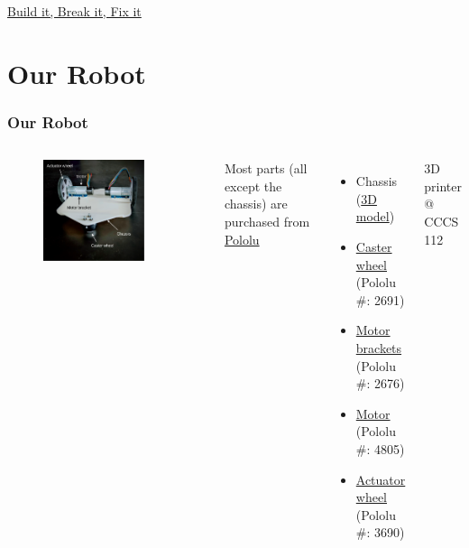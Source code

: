 \documentclass[12pt,letterpaper]{beamer}
\begin{document}
\begin{frame}{}
    \href{https://youtu.be/EezdinoG4mk}{Build it, Break it, Fix it}
    
\end{frame}

\section{Our Robot}

\begin{frame}
\frametitle{Our Robot}

\begin{columns}

\begin{figure}
    \includegraphics[width=0.8\textwidth]{3421bot}
\end{figure}

Most parts (all except the chassis) are purchased from \href{https://www.pololu.com/}{Pololu}
{\scriptsize 
\begin{itemize}
    \item Chassis (\href{https://github.com/linzhangUCA/robotics1-2021/blob/main/0819/chassis_v3.stl}{3D model})
    \item \href{https://www.pololu.com/product/2691}{Caster wheel} (Pololu \#: 2691) 
    \item \href{https://www.pololu.com/product/2676}{Motor brackets} (Pololu \#: 2676)
    \item \href{https://www.pololu.com/product/4805}{Motor} (Pololu \#: 4805)
    \item \href{https://www.pololu.com/product/3690}{Actuator wheel} (Pololu \#: 3690)
\end{itemize}

}
\begin{block}
\footnotesize 3D printer @ CCCS 112
\end{block}

\end{columns}

\end{frame}
\end{document}
